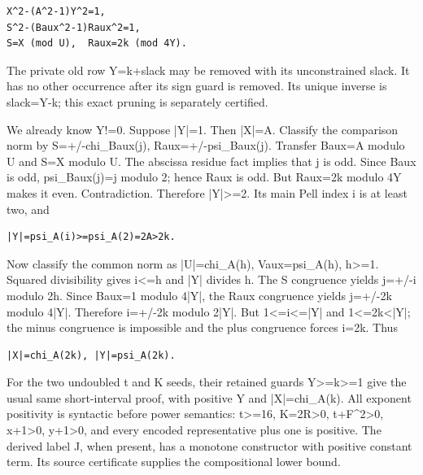 \begin{verbatim}
X^2-(A^2-1)Y^2=1,
S^2-(Baux^2-1)Raux^2=1,
S=X (mod U),  Raux=2k (mod 4Y).
\end{verbatim}

The private old row Y=\allowbreak{}k+\allowbreak{}slack may be removed with its unconstrained slack. It has no other occurrence after its sign guard is removed. Its unique inverse is slack=\allowbreak{}Y-k; this exact pruning is separately certified.



We already know Y!=\allowbreak{}0. Suppose |Y|=\allowbreak{}1. Then |X|=\allowbreak{}A. Classify the comparison norm by S=\allowbreak{}+\allowbreak{}/\allowbreak{}-chi\_\allowbreak{}Baux(j), Raux=\allowbreak{}+\allowbreak{}/\allowbreak{}-psi\_\allowbreak{}Baux(j). Transfer Baux=\allowbreak{}A modulo U and S=\allowbreak{}X modulo U. The abscissa residue fact implies that j is odd. Since Baux is odd, psi\_\allowbreak{}Baux(j)=\allowbreak{}j modulo 2; hence Raux is odd. But Raux=\allowbreak{}2k modulo 4Y makes it even. Contradiction. Therefore |Y|\textgreater{}\allowbreak{}=\allowbreak{}2. Its main Pell index i is at least two, and



\begin{verbatim}
|Y|=psi_A(i)>=psi_A(2)=2A>2k.
\end{verbatim}

Now classify the common norm as |U|=\allowbreak{}chi\_\allowbreak{}A(h), Vaux=\allowbreak{}psi\_\allowbreak{}A(h), h\textgreater{}\allowbreak{}=\allowbreak{}1. Squared divisibility gives i\textless{}\allowbreak{}=\allowbreak{}h and |Y| divides h. The S congruence yields j=\allowbreak{}+\allowbreak{}/\allowbreak{}-i modulo 2h. Since Baux=\allowbreak{}1 modulo 4|Y|, the Raux congruence yields j=\allowbreak{}+\allowbreak{}/\allowbreak{}-2k modulo 4|Y|. Therefore i=\allowbreak{}+\allowbreak{}/\allowbreak{}-2k modulo 2|Y|. But 1\textless{}\allowbreak{}=\allowbreak{}i\textless{}\allowbreak{}=\allowbreak{}|Y| and 1\textless{}\allowbreak{}=\allowbreak{}2k\textless{}\allowbreak{}|Y|; the minus congruence is impossible and the plus congruence forces i=\allowbreak{}2k. Thus



\begin{verbatim}
|X|=chi_A(2k), |Y|=psi_A(2k).
\end{verbatim}

For the two undoubled t and K seeds, their retained guards Y\textgreater{}\allowbreak{}=\allowbreak{}k\textgreater{}\allowbreak{}=\allowbreak{}1 give the usual same short-interval proof, with positive Y and |X|=\allowbreak{}chi\_\allowbreak{}A(k). All exponent positivity is syntactic before power semantics: t\textgreater{}\allowbreak{}=\allowbreak{}16, K=\allowbreak{}2R\textgreater{}\allowbreak{}0, t+\allowbreak{}F\textasciicircum{}\allowbreak{}2\textgreater{}\allowbreak{}0, x+\allowbreak{}1\textgreater{}\allowbreak{}0, y+\allowbreak{}1\textgreater{}\allowbreak{}0, and every encoded representative plus one is positive. The derived label J, when present, has a monotone constructor with positive constant term. Its source certificate supplies the compositional lower bound.



